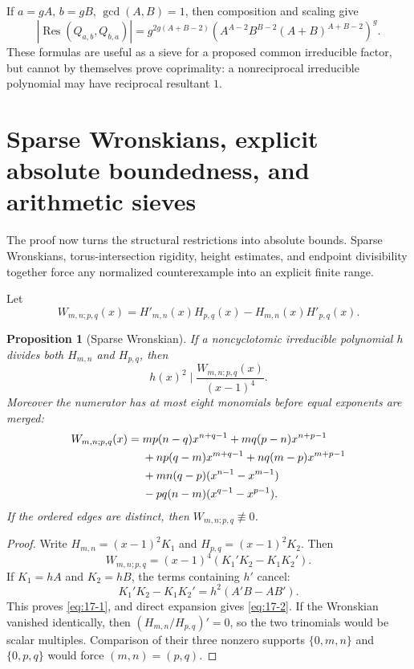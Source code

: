 \documentclass[11pt]{article}
\numberwithin{equation}{section}
\newtheorem{proposition}[theorem]{Proposition}
\theoremstyle{definition}
\newcommand{\Res}{\operatorname{Res}}
\begin{document}
If \(a=gA\), \(b=gB\), \(\gcd(A,B)=1\), then composition and scaling give
\begin{equation}
 \left|\Res(Q_{a,b},Q_{b,a})\right|
 =g^{2g(A+B-2)}
 \left(A^{A-2}B^{B-2}(A+B)^{A+B-2}\right)^g.
 \label{eq:16-3}
\end{equation}
These formulas are useful as a sieve for a proposed common irreducible factor,
but cannot by themselves prove coprimality: a nonreciprocal irreducible
polynomial may have reciprocal resultant \(1\).

\section{Sparse Wronskians, explicit absolute boundedness, and arithmetic sieves}
\label{sec:wronskian}

The proof now turns the structural restrictions into absolute bounds.  Sparse Wronskians, torus-intersection rigidity, height estimates, and endpoint divisibility together force any normalized counterexample into an explicit finite range.

Let
\[
 W_{m,n;p,q}(x)
 =H'_{m,n}(x)H_{p,q}(x)-H_{m,n}(x)H'_{p,q}(x).
\]

\begin{proposition}[Sparse Wronskian]\label{prop:wronskian}
If a noncyclotomic irreducible polynomial \(h\) divides both
\(H_{m,n}\) and \(H_{p,q}\), then
\begin{equation}
 h(x)^2\mid \frac{W_{m,n;p,q}(x)}{(x-1)^4}.
 \label{eq:17-1}
\end{equation}
Moreover the numerator has at most eight monomials before equal exponents are
merged:
\begin{align}
 W_{m,n;p,q}(x)={}&mp(n-q)x^{n+q-1}
 +mq(p-n)x^{n+p-1} \notag\\
 &+np(q-m)x^{m+q-1}
 +nq(m-p)x^{m+p-1} \notag\\
 &+mn(q-p)(x^{n-1}-x^{m-1}) \notag\\
 &-pq(n-m)(x^{q-1}-x^{p-1}).
 \label{eq:17-2}
\end{align}
If the ordered edges are distinct, then \(W_{m,n;p,q}\not\equiv0\).
\end{proposition}

\begin{proof}
Write \(H_{m,n}=(x-1)^2K_1\) and
\(H_{p,q}=(x-1)^2K_2\).  Then
\[
 W_{m,n;p,q}=(x-1)^4(K_1'K_2-K_1K_2').
\]
If \(K_1=hA\) and \(K_2=hB\), the terms containing \(h'\) cancel:
\[
 K_1'K_2-K_1K_2'=h^2(A'B-AB').
\]
This proves \eqref{eq:17-1}, and direct expansion gives \eqref{eq:17-2}.
If the Wronskian vanished identically, then
\((H_{m,n}/H_{p,q})'=0\), so the two trinomials would be scalar multiples.
Comparison of their three nonzero supports \(\{0,m,n\}\) and
\(\{0,p,q\}\) would force \((m,n)=(p,q)\).
\end{proof}
\end{document}
